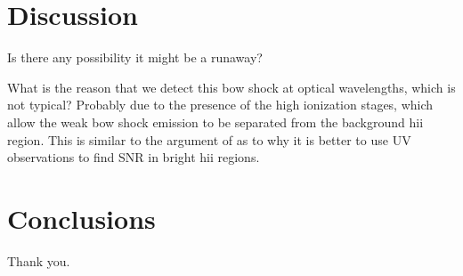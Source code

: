 \documentclass[twocolumn, times]{aastex631}
\begin{document}
\section{Discussion}
\label{sec:discussion}

Is there any possibility it might be a runaway?

What is the reason that we detect this bow shock
at optical wavelengths, which is not typical?
Probably due to the presence of the high ionization stages,
which allow the weak bow shock emission to be
separated from the background hii region.
This is similar to the argument of \citep{Danforth:2003m}
as to why it is better to use UV observations to find SNR in
bright hii regions. 


\section{Conclusions}
\label{sec:conclusions}

\begin{acknowledgments}
  Thank you.
\end{acknowledgments}



\end{document}
